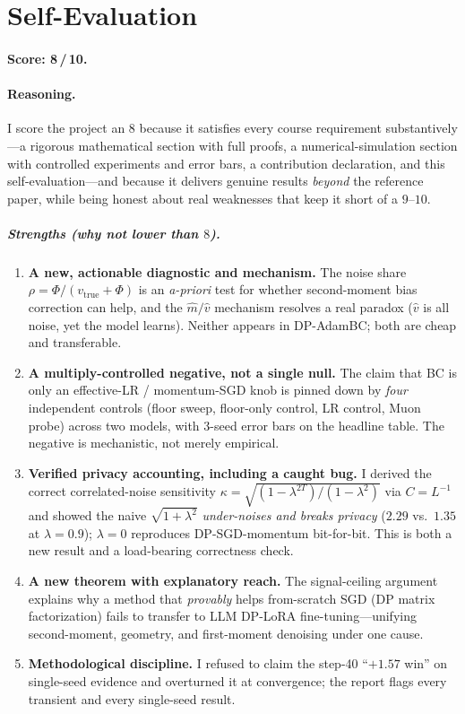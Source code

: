 \documentclass[11pt]{article}
\theoremstyle{plain}
\theoremstyle{definition}
\theoremstyle{remark}
\begin{document}
\section{Self-Evaluation}
\label{sec:selfeval}

\paragraph{Score: \textbf{8\,/\,10}.}

\paragraph{Reasoning.}
I score the project an $8$ because it satisfies every course requirement substantively---a
rigorous mathematical section with full proofs, a numerical-simulation section with controlled
experiments and error bars, a contribution declaration, and this self-evaluation---and because it
delivers genuine results \emph{beyond} the reference paper, while being honest about real
weaknesses that keep it short of a $9$--$10$.

\subparagraph*{Strengths (why not lower than $8$).}
\begin{enumerate}[leftmargin=1.6em,itemsep=2pt,topsep=2pt]
\item \textbf{A new, actionable diagnostic and mechanism.} The noise share
$\rho=\Phi/(v_{\mathrm{true}}+\Phi)$ is an \emph{a-priori} test for whether second-moment bias
correction can help, and the $\hat m/\hat v$ mechanism resolves a real paradox ($\hat v$ is all
noise, yet the model learns). Neither appears in DP-AdamBC; both are cheap and transferable.
\item \textbf{A multiply-controlled negative, not a single null.} The claim that BC is only an
effective-LR / momentum-SGD knob is pinned down by \emph{four} independent controls (floor sweep,
floor-only control, LR control, Muon probe) across two models, with $3$-seed error bars on the
headline table. The negative is mechanistic, not merely empirical.
\item \textbf{Verified privacy accounting, including a caught bug.} I derived the correct
correlated-noise sensitivity $\kappa=\sqrt{(1-\lambda^{2T})/(1-\lambda^2)}$ via $C=L^{-1}$ and
showed the naive $\sqrt{1+\lambda^2}$ \emph{under-noises and breaks privacy} ($2.29$ vs.\ $1.35$
at $\lambda{=}0.9$); $\lambda{=}0$ reproduces DP-SGD-momentum bit-for-bit. This is both a new
result and a load-bearing correctness check.
\item \textbf{A new theorem with explanatory reach.} The signal-ceiling argument explains why a
method that \emph{provably} helps from-scratch SGD (DP matrix factorization) fails to transfer to
LLM DP-LoRA fine-tuning---unifying second-moment, geometry, and first-moment denoising under one
cause.
\item \textbf{Methodological discipline.} I refused to claim the step-40 ``$+1.57$ win'' on
single-seed evidence and overturned it at convergence; the report flags every transient and every
single-seed result.
\end{enumerate}
\end{document}
